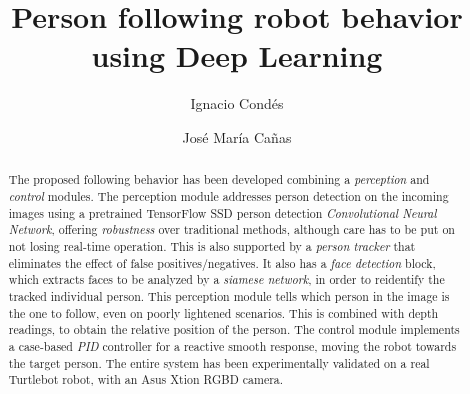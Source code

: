 \documentclass[11pt, a4paper]{svproc}
\title{Person following robot behavior using Deep Learning}
\author{Ignacio Condés
		\and José María Cañas}
\institute{Universidad Rey Juan Carlos}
\begin{document}
	\maketitle
	
	\begin{abstract}
		The proposed following behavior has been developed combining a \emph{perception} and \emph{control} modules. The perception module addresses person detection on the incoming images using a pretrained TensorFlow SSD person detection \emph{Convolutional Neural Network}, offering \emph{robustness} over traditional methods, although care has to be put on not losing real-time operation. This is also supported by a \emph{person tracker} that eliminates the effect of false positives/negatives. It also has a \emph{face detection} block, which extracts faces to be analyzed by a \emph{siamese network}, in order to reidentify the tracked individual person. This perception module tells which person in the image is the one to follow, even on poorly lightened scenarios. This is combined with depth readings, to obtain the relative position of the person. The control module implements a case-based \emph{PID} controller for a reactive smooth response, moving the robot towards the target person. The entire system has been experimentally validated on a real Turtlebot robot, with an Asus Xtion RGBD camera.
	\end{abstract}

	
	
\end{document}
